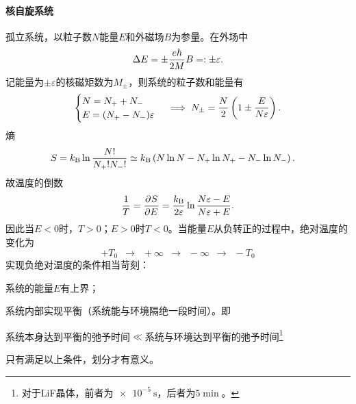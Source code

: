 \paragraph{核自旋系统}孤立系统，以粒子数$N$能量$E$和外磁场$B$为参量。在外场中
\[
	\Delta E=\pm\frac{e\hbar}{2M}B=:\pm\varepsilon.
\]
记能量为$\pm\varepsilon$的核磁矩数为$M_\pm$，则系统的粒子数和能量有
\begin{align*}
	\begin{cases}
		N=N_++N_- \\
		E=(N_+-N_-)\varepsilon
	\end{cases}\implies
	N_\pm=\frac N2\left(1\pm\frac E{N\varepsilon}\right).
\end{align*}
熵
\begin{align*}
	S & =k_{\mathrm B}\ln\frac{N!}{N_+!N_-!}\simeq k_{\mathrm B}\left(N\ln N-N_+\ln N_+-N_-\ln N_-\right).
\end{align*}
故温度的倒数
\begin{align}
	\frac 1T=\frac{\partial^{{}}S}{\partial{E}^{{}}}=\frac{k_{\mathrm B}}{2\varepsilon}\ln\frac{N\varepsilon-E}{N\varepsilon+E}.
\end{align}
因此当$E<0$时，$T>0$；$E>0$时$T<0$。当能量$E$从负转正的过程中，绝对温度的变化为
\[
	+T_0\enspace\longrightarrow\enspace+\infty\enspace\to\enspace -\infty\enspace\longrightarrow\enspace-T_0
\]
实现负绝对温度的条件相当苛刻：
\begin{compactenum}
	\item 系统的能量$E$有上界；
	\item 系统内部实现平衡（系统能与环境隔绝一段时间）。即

	      系统本身达到平衡的弛予时间$\ll$系统与环境达到平衡的弛予时间\footnote{对于LiF晶体，前者为$\SI{e-5}\s$，后者为$\SI{5}\min$。}
\end{compactenum}
只有满足以上条件，划分才有意义。
\begin{center}
\end{center}
